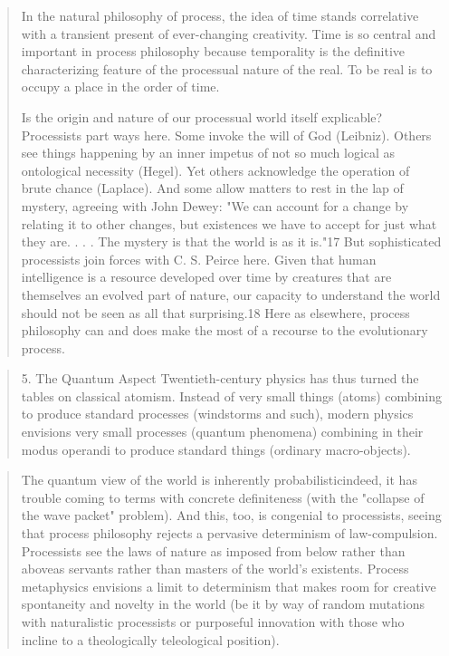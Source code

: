 \documentclass[a4paper]{Thesis}
\begin{document}
\begin{quotation}
		In the natural philosophy
		of process, the idea of time stands correlative with a transient present of ever-changing
		creativity. Time is so central and important in process philosophy because temporality is
		the definitive characterizing feature of the processual nature of the real. To be real is to
		occupy a place in the order of time.
		
		Is the origin and nature of our processual world itself explicable? Processists part ways
		here. Some invoke the will of God (Leibniz). Others see things happening by an inner
		impetus of not so much logical as ontological necessity (Hegel). Yet others acknowledge
		the operation of brute chance (Laplace). And some allow matters to rest in the lap of
		mystery, agreeing with John Dewey: "We can account for a change by relating it to other
		changes, but existences we have to accept for just what they are. . . . The mystery is that
		the world is as it is."17 But sophisticated processists join forces with C. S. Peirce here.
		Given that human intelligence is a resource developed over time by creatures that are
		themselves an evolved part of nature, our capacity to understand the world should not be
		seen as all that surprising.18 Here as elsewhere, process philosophy can and does make
		the most of a recourse to the evolutionary process.
	\end{quotation}
	
	
	\begin{quotation}
		5. The Quantum Aspect	
		Twentieth-century physics has thus turned the tables on classical atomism. Instead of
		very small things (atoms) combining to produce standard processes (windstorms and
		such), modern physics envisions very small processes (quantum phenomena) combining
		in their modus operandi to produce standard things (ordinary macro-objects).
	\end{quotation}
	
	\begin{quotation}
		The quantum view of the world is inherently probabilisticindeed, it has trouble coming to
		terms with concrete definiteness (with the "collapse of the wave packet" problem). And
		this, too, is congenial to processists, seeing that process philosophy rejects a pervasive
		determinism of law-compulsion. Processists see the laws of nature as imposed from
		below rather than aboveas servants rather than masters of the world's existents. Process
		metaphysics envisions a limit to determinism that makes room for creative spontaneity
		and novelty in the world (be it by way of random mutations with naturalistic processists
		or purposeful innovation with those who incline to a theologically teleological position).
	\end{quotation}
	
\end{document}
